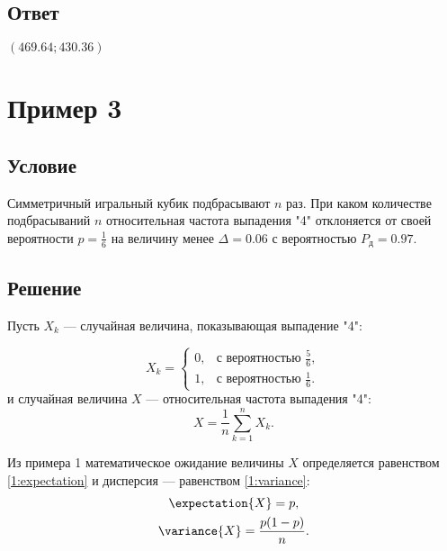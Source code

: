 \subsection*{Ответ}
$\left ( 469.64 ; 430.36 \right )$


\section{Пример 3}
\subsection*{Условие}
Симметричный игральный кубик подбрасывают $n$ раз. При каком количестве подбрасываний $n$ относительная частота выпадения "4"{} отклоняется от своей вероятности
$p = \frac{1}{6}$ на величину менее $\Delta = 0.06$ с вероятностью $P_\text{д} = 0.97$.

\subsection*{Решение}
Пусть $X_k$ --- случайная величина, показывающая выпадение "4":

\begin{equation}
    X_k =
    \left \{
    \begin{array}{ll}
        0, & \text{с вероятностью } \frac{5}{6},  \\
        1, & \text{с вероятностью } \frac{1}{6} .
    \end{array}
    \right .
\end{equation}
и случайная величина $X$ --- относительная частота выпадения "4":
\begin{equation}
    X = \frac{1}{n} \sum_{k=1}^n X_k .
\end{equation}

Из примера 1 математическое ожидание величины $X$ определяется равенством \eqref{1:expectation} и дисперсия --- равенством \eqref{1:variance}:
\begin{gather}
    \expectation{X} = p, \\
    \variance{X} = \frac{p ( 1 - p )}{n} .
\end{gather}

